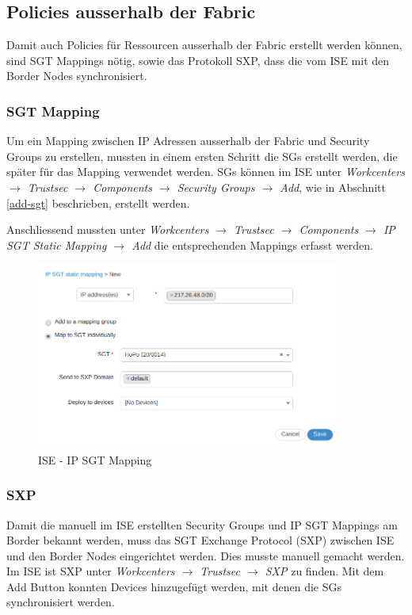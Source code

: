\subsection{Policies ausserhalb der Fabric}

Damit auch Policies für Ressourcen ausserhalb der Fabric erstellt werden können, sind SGT Mappings nötig, sowie das Protokoll SXP, dass die vom ISE mit den Border Nodes synchronisiert.

\subsubsection{SGT Mapping}
\label{sxp-mapping}
Um ein Mapping zwischen IP Adressen ausserhalb der Fabric und Security Groups zu erstellen, mussten in einem ersten Schritt die SGs erstellt werden, die später für das Mapping verwendet werden. SGs können im ISE unter \textit{Workcenters $\rightarrow$ Trustsec $\rightarrow$ Components $\rightarrow$ Security Groups $\rightarrow$ Add}, wie in Abschnitt \ref{add-sgt} beschrieben, erstellt werden.

Anschliessend mussten unter \textit{Workcenters $\rightarrow$ Trustsec $\rightarrow$ Components $\rightarrow$ IP SGT Static Mapping $\rightarrow$ Add} die entsprechenden Mappings erfasst werden.

\begin{figure}[H]
	\centering
	\includegraphics[width=10cm]{img/secondtry/ise-sgt-mapping.png}
	\caption{ISE - IP SGT Mapping}
	\label{fig:ise-ip-sgt-mapping}
\end{figure}

\subsubsection{SXP}

Damit die manuell im ISE erstellten Security Groups und IP SGT Mappings am Border bekannt werden, muss das SGT Exchange Protocol (SXP) zwischen ISE und den Border Nodes eingerichtet werden. Dies musste manuell gemacht werden.
Im ISE ist SXP unter \textit{Workcenters $\rightarrow$ Trustsec $\rightarrow$ SXP} zu finden. Mit dem Add Button konnten Devices hinzugefügt werden, mit denen die SGs synchronisiert werden.

